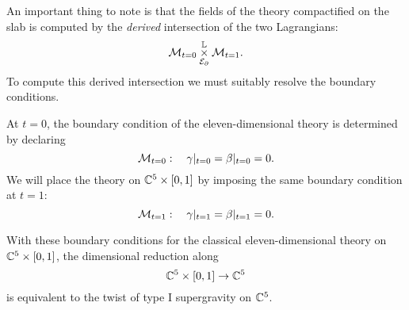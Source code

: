 An important thing to note is that the fields of the theory compactified on the slab is computed by the {\em derived} intersection of the two Lagrangians:
\[
\mathcal M_{t=0} \overset{\mathbb L}{\underset{\mathcal E_{\partial}}{\times}}\mathcal M_{t=1}.
\]
To compute this derived intersection we must suitably resolve the boundary conditions.


\parsec[s:boundary]
At $t=0$, the boundary condition of the eleven-dimensional theory is determined by declaring 
\[
\mathcal M_{t=0}: \quad \gamma|_{t=0} = \beta|_{t=0} = 0 .
\]
We will place the theory on $\mathbb C^5 \times [0,1]$ by imposing the same boundary condition at $t=1$:
\[
\mathcal M_{t=1}: \quad \gamma|_{t=1} = \beta|_{t=1} = 0 .
\]

\begin{prop}
With these boundary conditions for the classical eleven-dimensional theory on $\mathbb C^5 \times [0,1]$, the dimensional reduction along 
\[
\mathbb C^5 \times [0,1] \to \mathbb C^5
\]
is equivalent to the twist of type I supergravity on $\mathbb C^5$. 
\end{prop}
